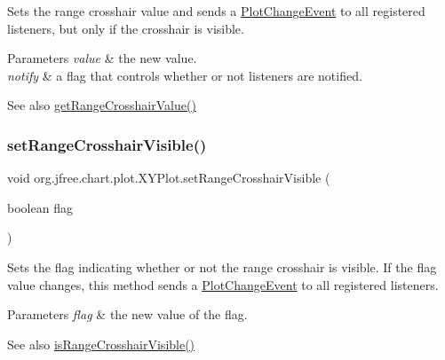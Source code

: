 Sets the range crosshair value and sends a \mbox{\hyperlink{}{Plot\+Change\+Event}} to all registered listeners, but only if the crosshair is visible.


\begin{DoxyParams}{Parameters}
{\em value} & the new value. \\
\hline
{\em notify} & a flag that controls whether or not listeners are notified.\\
\hline
\end{DoxyParams}
\begin{DoxySeeAlso}{See also}
\mbox{\hyperlink{classorg_1_1jfree_1_1chart_1_1plot_1_1_x_y_plot_a5ea3dd940ae92c3196aa77833a6c96d1}{get\+Range\+Crosshair\+Value()}} 
\end{DoxySeeAlso}
\mbox{\label{classorg_1_1jfree_1_1chart_1_1plot_1_1_x_y_plot_a0ac34a6f57e3bbcfaba9a502be7fbe2e}} 
\subsubsection{\texorpdfstring{set\+Range\+Crosshair\+Visible()}{setRangeCrosshairVisible()}}
{\footnotesize\ttfamily void org.\+jfree.\+chart.\+plot.\+X\+Y\+Plot.\+set\+Range\+Crosshair\+Visible (\begin{DoxyParamCaption}\item[{boolean}]{flag }\end{DoxyParamCaption})}

Sets the flag indicating whether or not the range crosshair is visible. If the flag value changes, this method sends a \mbox{\hyperlink{}{Plot\+Change\+Event}} to all registered listeners.


\begin{DoxyParams}{Parameters}
{\em flag} & the new value of the flag.\\
\hline
\end{DoxyParams}
\begin{DoxySeeAlso}{See also}
\mbox{\hyperlink{classorg_1_1jfree_1_1chart_1_1plot_1_1_x_y_plot_a141d93dd4ffb2ed0a73aa37e745ed9ee}{is\+Range\+Crosshair\+Visible()}} 
\end{DoxySeeAlso}
\mbox{\label{classorg_1_1jfree_1_1chart_1_1plot_1_1_x_y_plot_a18ad3cf0c12818de2620718ec02a7532}} 
